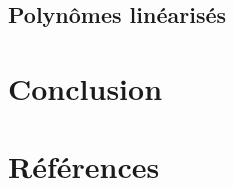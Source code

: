 \documentclass[12pt]{article}
\theoremstyle{definition}
\begin{document}
\subsection{Polynômes linéarisés}



\pagebreak

\section*{Conclusion}

\pagebreak


\section*{Références}
\end{document}
